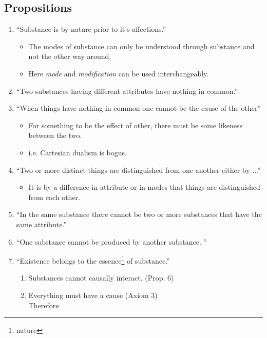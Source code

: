 \documentclass{article}
\begin{document}
\begin{spacing}{1.2}
        \subsection*{Propositions}
        \begin{enumerate}
            \item ``Substance is by nature prior to it's affections.''
            \begin{itemize}
                \item The modes of substance can only be understood through substance and not the other way around.
                \item Here \emph{mode} and \emph{modification} can be used interchangeably.
            \end{itemize}
            \item ``Two substances having different attributes have nothing in common.''
            \item ``When things have nothing in common one cannot be the cause of the other''
            \begin{itemize}
                \item For something to be the effect of other, there must be some likeness between the two. 
                \item i.e. Cartesian dualism is bogus.
            \end{itemize}
            \item ``Two or more distinct things are distinguished from one another either by ...''
            \begin{itemize}
                \item It is by a difference in attribute or in modes that things are distinguished from each other. 
            \end{itemize}
            \item ``In the same substance there cannot be two or more substances that have the same attribute.''
            \item ``One substance cannot be produced by another substance. ''
            \item ``Existence belongs to the essence\footnote{nature} of substance.''
            \begin{enumerate}
                \item Substances cannot causally interact. (Prop. 6)
                \item Everything must have a cause (Axiom 3)
                \\Therefore

\end{enumerate}
\end{enumerate}
\end{spacing}
\end{document}
